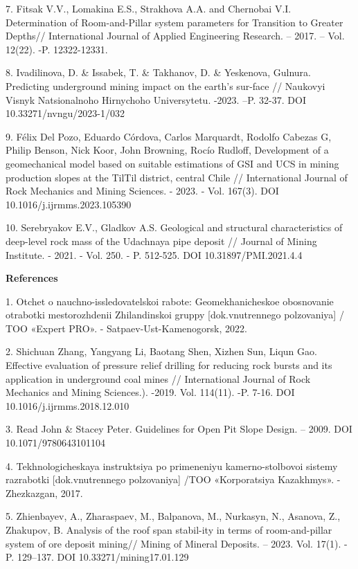 7. Fitsak V.V., Lomakina E.S., Strakhova A.A. and Chernobai V.I.
Determination of Room-and-Pillar system parameters for Transition to
Greater Depths// International Journal of Applied Engineering Research.
-- 2017. -- Vol. 12(22). -P. 12322-12331.

8. Ivadilinova, D. \& Issabek, T. \& Takhanov, D. \& Yeskenova, Gulnura.
Predicting underground mining impact on the earth's sur-face // Naukovyi
Visnyk Natsionalnoho Hirnychoho Universytetu. -2023. --P. 32-37. DOI
10.33271/nvngu/2023-1/032

9. Félix Del Pozo, Eduardo Córdova, Carlos Marquardt, Rodolfo Cabezas G,
Philip Benson, Nick Koor, John Browning, Rocío Rudloff, Development of a
geomechanical model based on suitable estimations of GSI and UCS in
mining production slopes at the TilTil district, central Chile //
International Journal of Rock Mechanics and Mining Sciences. - 2023. -
Vol. 167(3). DOI 10.1016/j.ijrmms.2023.105390

10. Serebryakov E.V., Gladkov A.S. Geological and structural
characteristics of deep-level rock mass of the Udachnaya pipe deposit //
Journal of Mining Institute. - 2021. - Vol. 250. - P. 512-525. DOI
10.31897/PMI.2021.4.4

{\bfseries References}

1. Otchet o nauchno-issledovatel\textquotesingle skoi rabote:
Geomekhanicheskoe obosnovanie otrabotki mestorozhdenii Zhilandinskoi
gruppy {[}dok.vnutrennego pol\textquotesingle zovaniya{]} / TOO «Expert
PRO». - Satpaev-Ust\textquotesingle-Kamenogorsk, 2022.

2. Shichuan Zhang, Yangyang Li, Baotang Shen, Xizhen Sun, Liqun Gao.
Effective evaluation of pressure relief drilling for reducing rock
bursts and its application in underground coal mines // International
Journal of Rock Mechanics and Mining Sciences.). -2019. Vol. 114(11).
-P. 7-16. DOI 10.1016/j.ijrmms.2018.12.010

3. Read John \& Stacey Peter. Guidelines for Open Pit Slope Design. --
2009. DOI 10.1071/9780643101104

4. Tekhnologicheskaya instruktsiya po primeneniyu kamerno-stolbovoi
sistemy razrabotki {[}dok.vnutrennego pol\textquotesingle zovaniya{]}
/TOO «Korporatsiya Kazakhmys». - Zhezkazgan, 2017.

5. Zhienbayev, A., Zharaspaev, M., Balpanova, M., Nurkasyn, N., Asanova,
Z., Zhakupov, B. Analysis of the roof span stabil-ity in terms of
room-and-pillar system of ore deposit mining// Mining of Mineral
Deposits. -- 2023. Vol. 17(1). - P. 129--137. DOI
10.33271/mining17.01.129

